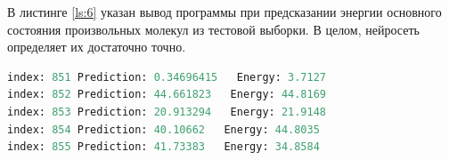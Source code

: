 В листинге \ref{ls:6} указан вывод программы при предсказании энергии основного состояния произвольных молекул из тестовой выборки. В целом, нейросеть определяет их достаточно точно.

\begin{lstlisting}[caption={Тестирование модели на небольшом списке из тестовой выборки},language=python,label={ls:6}] 
index: 851 Prediction: 0.34696415   Energy: 3.7127
index: 852 Prediction: 44.661823   Energy: 44.8169
index: 853 Prediction: 20.913294   Energy: 21.9148
index: 854 Prediction: 40.10662   Energy: 44.8035
index: 855 Prediction: 41.73383   Energy: 34.8584
\end{lstlisting}
